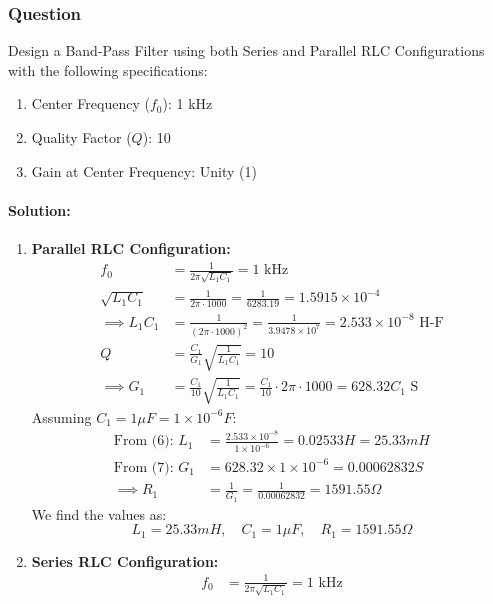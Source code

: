 \subsubsection{Question}
Design a Band-Pass Filter using both Series and Parallel RLC
Configurations with the following specifications:
\begin{enumerate}
  \item Center Frequency (\(f_0\)): 1 kHz
  \item Quality Factor (\(Q\)): 10
  \item Gain at Center Frequency: Unity (1)
\end{enumerate}
\paragraph{Solution:}
\begin{enumerate}
  \item \textbf{Parallel RLC Configuration:}
    \begin{align*}
      f_0 &= \frac{1}{2\pi \sqrt{L_1 C_1}} = 1 \text{ kHz} \\
      \sqrt{L_1 C_1} &= \frac{1}{2\pi \cdot 1000} = \frac{1}{6283.19} = 1.5915 \times 10^{-4} \\
      \implies L_1 C_1 &= \frac{1}{(2\pi \cdot 1000)^2} = \frac{1}{3.9478 \times 10^{7}} = 2.533 \times 10^{-8} \text{ H-F} \tag{6} \\
      Q &= \frac{C_1}{G_1} \sqrt{\frac{1}{L_1 C_1}} = 10 \\
      \implies G_1 &= \frac{C_1}{10} \sqrt{\frac{1}{L_1 C_1}} = \frac{C_1}{10} \cdot 2\pi \cdot 1000 = 628.32 C_1 \text{ S} \tag{7}
    \end{align*}
    Assuming \(C_1 = 1 \mu F = 1 \times 10^{-6} F\):
    \begin{align*}
      \text{From (6): } L_1 &= \frac{2.533 \times 10^{-8}}{1 \times 10^{-6}} = 0.02533 H = 25.33 mH \\
      \text{From (7): } G_1 &= 628.32 \times 1 \times 10^{-6} = 0.00062832 S \\
      \implies R_1 &= \frac{1}{G_1} = \frac{1}{0.00062832} = 1591.55 \Omega
    \end{align*}
    We find the values as:
    \[
      L_1 = 25.33 mH, \quad C_1 = 1 \mu F, \quad R_1 = 1591.55 \Omega
    \]
  \item \textbf{Series RLC Configuration:}
    \begin{align*}
      f_0 &= \frac{1}{2\pi \sqrt{L_1 C_1}} = 1 \text{ kHz} \\

\end{align*}
\end{enumerate}
